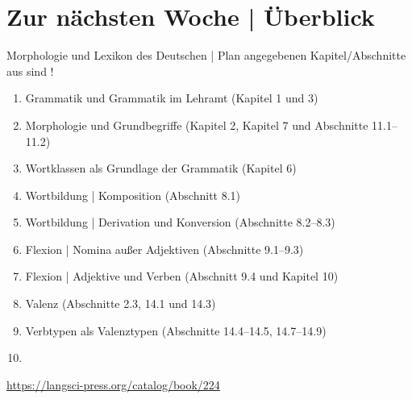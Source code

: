 \section{Zur nächsten Woche | Überblick}

\begin{frame}
  {Morphologie und Lexikon des Deutschen | Plan}
   angegebenen Kapitel\slash Abschnitte aus  sind !\\
  \Halbzeile
  \begin{enumerate}
    \item Grammatik und Grammatik im Lehramt (Kapitel 1 und 3)
    \item Morphologie und Grundbegriffe (Kapitel 2, Kapitel 7 und Abschnitte 11.1--11.2)
    \item Wortklassen als Grundlage der Grammatik (Kapitel 6)
    \item Wortbildung | Komposition (Abschnitt 8.1)
    \item Wortbildung | Derivation und Konversion (Abschnitte 8.2--8.3)
    \item Flexion | Nomina außer Adjektiven (Abschnitte 9.1--9.3)
    \item Flexion | Adjektive und Verben (Abschnitt 9.4 und Kapitel 10)
    \item Valenz (Abschnitte 2.3, 14.1 und 14.3)
    \item Verbtypen als Valenztypen (Abschnitte 14.4--14.5, 14.7--14.9) 
    \item {}
  \end{enumerate}
  \Halbzeile
  \centering 
  \url{https://langsci-press.org/catalog/book/224}
\end{frame}

